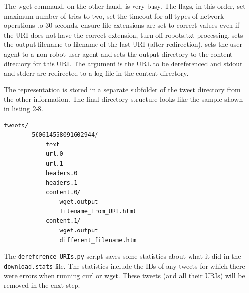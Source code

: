 \documentclass[a4paper,12pt]{article}
\begin{document}
The wget command, on the other hand, is very busy. The flags, in this order, set maximum number of tries
to two, set the timeout for all types of network operations to 30 seconds, ensure file extensions are set to
correct values even if the URI does not have the correct extension, turn off robots.txt processing,
sets the output filename to filename of the last URI (after redirection), sets the user-agent to a
non-robot user-agent and sets the output directory to the content directory for this URI. The argument is
the URL to be dereferenced and stdout and stderr are redirected to a log file in the content directory.

The representation is stored in a separate subfolder of the tweet directory from the other information.
The final directory structure looks like the sample shown in listing 2-8.
\begin{lstlisting}[basicstyle=\ttfamily,caption={Sample Final Directory Structure}]
    tweets/
        560614568091602944/
            text
            url.0
            url.1
            headers.0
            headers.1
            content.0/
                wget.output
                filename_from_URI.html
            content.1/
                wget.output
                different_filename.htm
\end{lstlisting}
The \texttt{dereference\_URIs.py} script saves some statistics about what it did in the
\texttt{download.stats} file. The statistics include the IDs of any tweets for which there were errors
when running curl or wget. These tweets (and all their URIs) will be removed in the enxt step.
\end{document}
